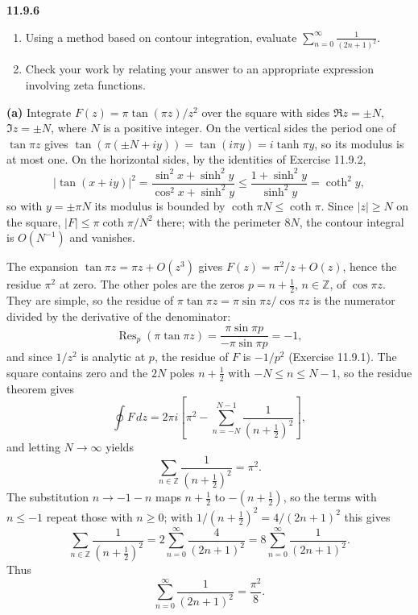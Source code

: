 \par\bigskip
\noindent\textbf{11.9.6}\quad
\begin{enumerate}
\item[(a)] Using a method based on contour integration, evaluate
  $\displaystyle\sum_{n=0}^{\infty}\frac{1}{(2n+1)^{2}}$.
\item[(b)] Check your work by relating your answer to an appropriate
  expression involving zeta functions.
\end{enumerate}
\solution
\textbf{(a)} Integrate $F(z)=\pi\tan(\pi z)/z^2$ over the square
with sides $\Re z=\pm N$, $\Im z=\pm N$, where $N$ is a positive
integer. On the vertical sides the period one of $\tan\pi z$ gives
$\tan(\pi(\pm N+iy))=\tan(i\pi y)=i\tanh\pi y$, so its modulus is at
most one. On the horizontal sides, by the identities of
Exercise 11.9.2,
\[
|\tan(x+iy)|^2=\frac{\sin^2x+\sinh^2y}{\cos^2x+\sinh^2y}
\le\frac{1+\sinh^2y}{\sinh^2y}=\coth^2y,
\]
so with $y=\pm\pi N$ its modulus is bounded by
$\coth\pi N\le\coth\pi$. Since $|z|\ge N$ on the square,
$|F|\le\pi\coth\pi/N^2$ there; with the perimeter $8N$, the contour
integral is $O(N^{-1})$ and vanishes.

The expansion $\tan\pi z=\pi z+O(z^3)$ gives
$F(z)=\pi^2/z+O(z)$, hence the residue $\pi^2$ at zero. The other
poles are the zeros $p=n+\tfrac12$, $n\in\mathbb Z$, of
$\cos\pi z$. They are simple, so the residue of
$\pi\tan\pi z=\pi\sin\pi z/\cos\pi z$ is the numerator divided by
the derivative of the denominator:
\[
\operatorname{Res}_{p}(\pi\tan\pi z)
=\frac{\pi\sin\pi p}{-\pi\sin\pi p}=-1,
\]
and since $1/z^2$ is analytic at $p$, the residue of $F$ is $-1/p^2$
(Exercise 11.9.1). The square contains zero and the $2N$ poles
$n+\frac12$ with $-N\le n\le N-1$, so the residue theorem gives
\[
\oint F\,dz=2\pi i\left[\pi^2-\sum_{n=-N}^{N-1}
\frac1{(n+\tfrac12)^2}\right],
\]
and letting $N\to\infty$ yields
\[
\sum_{n\in\mathbb Z}\frac1{(n+\tfrac12)^2}=\pi^2.
\]
The substitution $n\to-1-n$ maps $n+\frac12$ to $-(n+\frac12)$, so
the terms with $n\le-1$ repeat those with $n\ge0$; with
$1/(n+\frac12)^2=4/(2n+1)^2$ this gives
\[
\sum_{n\in\mathbb Z}\frac1{(n+\tfrac12)^2}
=2\sum_{n=0}^{\infty}\frac4{(2n+1)^2}
=8\sum_{n=0}^{\infty}\frac1{(2n+1)^2}.
\]
Thus
\[
\boxed{\sum_{n=0}^{\infty}\frac1{(2n+1)^2}=\frac{\pi^2}{8}}.
\]

